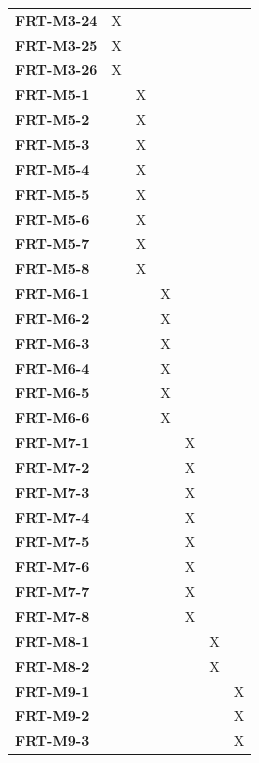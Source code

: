 \documentclass[12pt, titlepage]{article}
\begin{document}
\begin{longtable}{|l|cccccc|}
  \textbf{FRT-M3-24} & X & ~ & ~ & ~ & ~ & ~ \\
  \textbf{FRT-M3-25} & X & ~ & ~ & ~ & ~ & ~ \\
  \textbf{FRT-M3-26} & X & ~ & ~ & ~ & ~ & ~ \\
  \textbf{FRT-M5-1} & ~ & X & ~ & ~ & ~ & ~ \\
  \textbf{FRT-M5-2} & ~ & X & ~ & ~ & ~ & ~ \\
  \textbf{FRT-M5-3} & ~ & X & ~ & ~ & ~ & ~ \\
  \textbf{FRT-M5-4} & ~ & X & ~ & ~ & ~ & ~ \\
  \textbf{FRT-M5-5} & ~ & X & ~ & ~ & ~ & ~ \\
  \textbf{FRT-M5-6} & ~ & X & ~ & ~ & ~ & ~ \\
  \textbf{FRT-M5-7} & ~ & X & ~ & ~ & ~ & ~ \\
  \textbf{FRT-M5-8} & ~ & X & ~ & ~ & ~ & ~ \\
  \textbf{FRT-M6-1} & ~ & ~ & X & ~ & ~ & ~ \\
  \textbf{FRT-M6-2} & ~ & ~ & X & ~ & ~ & ~ \\
  \textbf{FRT-M6-3} & ~ & ~ & X & ~ & ~ & ~ \\
  \textbf{FRT-M6-4} & ~ & ~ & X & ~ & ~ & ~ \\
  \textbf{FRT-M6-5} & ~ & ~ & X & ~ & ~ & ~ \\
  \textbf{FRT-M6-6} & ~ & ~ & X & ~ & ~ & ~ \\
  \textbf{FRT-M7-1} & ~ & ~ & ~ & X & ~ & ~ \\
  \textbf{FRT-M7-2} & ~ & ~ & ~ & X & ~ & ~ \\
  \textbf{FRT-M7-3} & ~ & ~ & ~ & X & ~ & ~ \\
  \textbf{FRT-M7-4} & ~ & ~ & ~ & X & ~ & ~ \\
  \textbf{FRT-M7-5} & ~ & ~ & ~ & X & ~ & ~ \\
  \textbf{FRT-M7-6} & ~ & ~ & ~ & X & ~ & ~ \\
  \textbf{FRT-M7-7} & ~ & ~ & ~ & X & ~ & ~ \\
  \textbf{FRT-M7-8} & ~ & ~ & ~ & X & ~ & ~ \\
  \textbf{FRT-M8-1} & ~ & ~ & ~ & ~ & X & ~ \\
  \textbf{FRT-M8-2} & ~ & ~ & ~ & ~ & X & ~ \\
  \textbf{FRT-M9-1} & ~ & ~ & ~ & ~ & ~ & X \\
  \textbf{FRT-M9-2} & ~ & ~ & ~ & ~ & ~ & X \\
  \textbf{FRT-M9-3} & ~ & ~ & ~ & ~ & ~ & X \\

\end{longtable}
\end{document}
